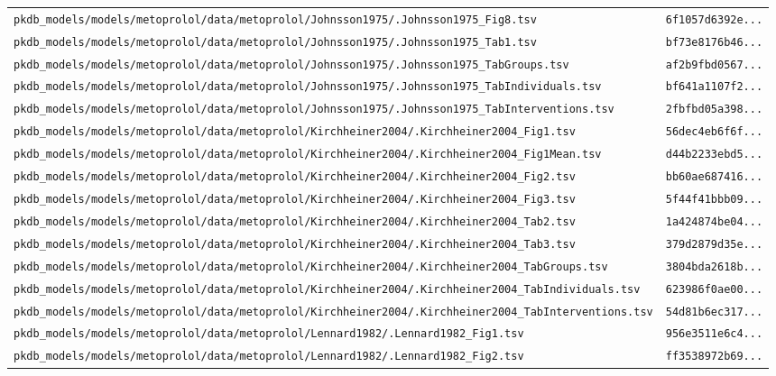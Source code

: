 \begin{longtable}{ll}
\texttt{pkdb\_models/models/metoprolol/data/metoprolol/Johnsson1975/.Johnsson1975\_Fig8.tsv} & \texttt{6f1057d6392e...} \\
\texttt{pkdb\_models/models/metoprolol/data/metoprolol/Johnsson1975/.Johnsson1975\_Tab1.tsv} & \texttt{bf73e8176b46...} \\
\texttt{pkdb\_models/models/metoprolol/data/metoprolol/Johnsson1975/.Johnsson1975\_TabGroups.tsv} & \texttt{af2b9fbd0567...} \\
\texttt{pkdb\_models/models/metoprolol/data/metoprolol/Johnsson1975/.Johnsson1975\_TabIndividuals.tsv} & \texttt{bf641a1107f2...} \\
\texttt{pkdb\_models/models/metoprolol/data/metoprolol/Johnsson1975/.Johnsson1975\_TabInterventions.tsv} & \texttt{2fbfbd05a398...} \\
\texttt{pkdb\_models/models/metoprolol/data/metoprolol/Kirchheiner2004/.Kirchheiner2004\_Fig1.tsv} & \texttt{56dec4eb6f6f...} \\
\texttt{pkdb\_models/models/metoprolol/data/metoprolol/Kirchheiner2004/.Kirchheiner2004\_Fig1Mean.tsv} & \texttt{d44b2233ebd5...} \\
\texttt{pkdb\_models/models/metoprolol/data/metoprolol/Kirchheiner2004/.Kirchheiner2004\_Fig2.tsv} & \texttt{bb60ae687416...} \\
\texttt{pkdb\_models/models/metoprolol/data/metoprolol/Kirchheiner2004/.Kirchheiner2004\_Fig3.tsv} & \texttt{5f44f41bbb09...} \\
\texttt{pkdb\_models/models/metoprolol/data/metoprolol/Kirchheiner2004/.Kirchheiner2004\_Tab2.tsv} & \texttt{1a424874be04...} \\
\texttt{pkdb\_models/models/metoprolol/data/metoprolol/Kirchheiner2004/.Kirchheiner2004\_Tab3.tsv} & \texttt{379d2879d35e...} \\
\texttt{pkdb\_models/models/metoprolol/data/metoprolol/Kirchheiner2004/.Kirchheiner2004\_TabGroups.tsv} & \texttt{3804bda2618b...} \\
\texttt{pkdb\_models/models/metoprolol/data/metoprolol/Kirchheiner2004/.Kirchheiner2004\_TabIndividuals.tsv} & \texttt{623986f0ae00...} \\
\texttt{pkdb\_models/models/metoprolol/data/metoprolol/Kirchheiner2004/.Kirchheiner2004\_TabInterventions.tsv} & \texttt{54d81b6ec317...} \\
\texttt{pkdb\_models/models/metoprolol/data/metoprolol/Lennard1982/.Lennard1982\_Fig1.tsv} & \texttt{956e3511e6c4...} \\
\texttt{pkdb\_models/models/metoprolol/data/metoprolol/Lennard1982/.Lennard1982\_Fig2.tsv} & \texttt{ff3538972b69...} \\

\end{longtable}
